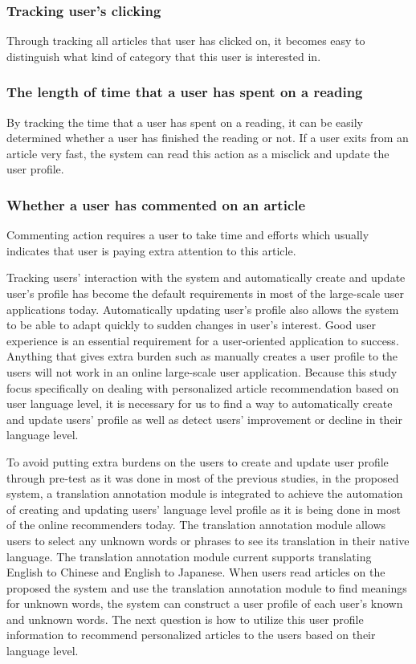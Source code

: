 \subsubsection{Tracking user's clicking}
\vspace{10pt}
Through tracking all articles that user has clicked on, it becomes easy to distinguish what kind of category that this user is interested in.
\subsubsection{The length of time that a user has spent on a reading}
\vspace{10pt}
By tracking the time that a user has spent on a reading, it can be easily determined whether a user has finished the reading or not. If a user exits from an article very fast, the system can read this action as a misclick and update the user profile.
\subsubsection{Whether a user has commented on an article}
\vspace{10pt}
Commenting action requires a user to take time and efforts which usually indicates that user is paying extra attention to this article.

Tracking users' interaction with the system and automatically create and update user's profile has become the default requirements in most of the large-scale user applications today. Automatically updating user's profile also allows the system to be able to adapt quickly to sudden changes in user's interest. Good user experience is an essential requirement for a user-oriented application to success. Anything that gives extra burden such as manually creates a user profile to the users will not work in an online large-scale user application. Because this study focus specifically on dealing with personalized article recommendation based on user language level, it is necessary for us to find a way to automatically create and update users' profile as well as detect users' improvement or decline in their language level. 

To avoid putting extra burdens on the users to create and update user profile through pre-test as it was done in most of the previous studies, in the proposed system, a translation annotation module is integrated to achieve the automation of creating and updating users' language level profile as it is being done in most of the online recommenders today. The translation annotation module allows users to select any unknown words or phrases to see its translation in their native language. The translation annotation module current supports translating English to Chinese and English to Japanese. When users read articles on the proposed the system and use the translation annotation module to find meanings for unknown words, the system can construct a user profile of each user's known and unknown words. The next question is how to utilize this user profile information to recommend personalized articles to the users based on their language level.

